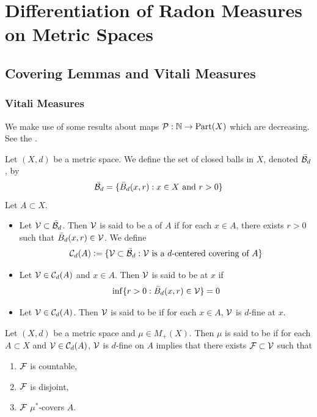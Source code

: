 \documentclass{book}
\begin{document}
	
	\newpage
	\chapter{Differentiation of Radon Measures on Metric Spaces}
	
	\section{Covering Lemmas and Vitali Measures}
	
	\subsection{Vitali Measures}
	
	
	\begin{note}
		We make use of some results about maps $\mathcal{P}: \mathbb{N} \rightarrow \text{Part}(X)$ which are decreasing. See the . 
	\end{note}
	
	\begin{defn} 
		Let $(X,d)$ be a metric space. We define the set of closed balls in $X$, denoted $\bar{\mathcal{B}}_d$, by
		$$\bar{\mathcal{B}}_d =  \{\bar{B}_d(x, r): x \in X \text{ and } r > 0\}$$
		Let $A \subset X$. 
		\begin{itemize}
			\item Let $\mathcal{V} \subset \bar{\mathcal{B}}_d$. Then $\mathcal{V}$ is said to be a  of $A$ if for each $x \in A$, there exists $r > 0$ such that $\bar{B}_d(x, r) \in \mathcal{V}$. We define 
			$$\mathcal{C}_d(A) \vcentcolon= \{ \mathcal{V} \subset \bar{\mathcal{B}}_d: \mathcal{V} \text{ is a $d$-centered covering of } A\}$$
			\item Let $\mathcal{V} \in \mathcal{C}_d(A)$ and $x \in A$. Then $\mathcal{V}$ is said to be  at $x$ if 
			$$\inf \{r > 0 : \bar{B}_d(x,r) \in \mathcal{V}\} = 0$$
			\item Let $\mathcal{V} \in \mathcal{C}_d(A)$. Then $\mathcal{V}$ is said to be  if for each $x \in A$, $\mathcal{V}$ is $d$-fine at $x$.
		\end{itemize}
	\end{defn}
	
	\begin{defn} 
		Let $(X, d)$ be a metric space and $\mu \in M_+(X)$. Then $\mu$ is said to be  if for each $A \subset X$ and $\mathcal{V} \in \mathcal{C}_d(A)$, $\mathcal{V}$ is $d$-fine on $A$ implies that there exists $\mathcal{F} \subset \mathcal{V}$ such that 
		\begin{enumerate}
			\item $\mathcal{F}$ is countable,
			\item $\mathcal{F}$ is disjoint,
			\item $\mathcal{F}$ $\mu^*$-covers $A$.
		\end{enumerate}
	\end{defn}
	
\end{document}
